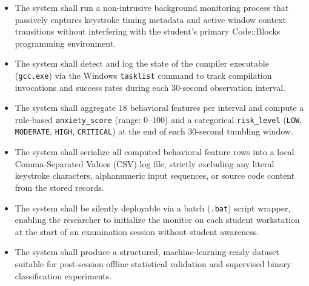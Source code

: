 \begin{itemize}
    \item The system shall run a non-intrusive background monitoring process that passively captures keystroke timing metadata and active window context transitions without interfering with the student's primary Code::Blocks programming environment.
    \item The system shall detect and log the state of the compiler executable (\texttt{gcc.exe}) via the Windows \texttt{tasklist} command to track compilation invocations and success rates during each 30-second observation interval.
    \item The system shall aggregate 18 behavioral features per interval and compute a rule-based \texttt{anxiety\_score} (range: 0--100) and a categorical \texttt{risk\_level} (\texttt{LOW}, \texttt{MODERATE}, \texttt{HIGH}, \texttt{CRITICAL}) at the end of each 30-second tumbling window.
    \item The system shall serialize all computed behavioral feature rows into a local Comma-Separated Values (CSV) log file, strictly excluding any literal keystroke characters, alphanumeric input sequences, or source code content from the stored records.
    \item The system shall be silently deployable via a batch (\texttt{.bat}) script wrapper, enabling the researcher to initialize the monitor on each student workstation at the start of an examination session without student awareness.
    \item The system shall produce a structured, machine-learning-ready dataset suitable for post-session offline statistical validation and supervised binary classification experiments.
\end{itemize}

